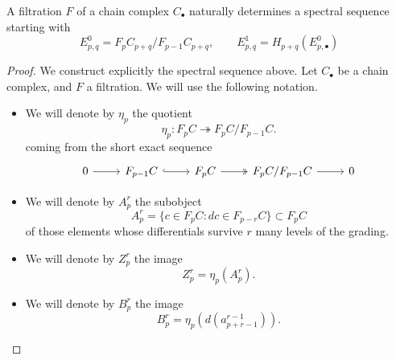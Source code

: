 \documentclass[main.tex]{subfiles}
\begin{document}
\begin{theorem}
  \label{thm:filtered_spectral_sequence_construction_thereom}
  A filtration $F$ of a chain complex $C_{\bullet}$ naturally determines a spectral sequence starting with
  \begin{equation*}
    E^{0}_{p,q} = F_{p}C_{p+q}/F_{p-1}C_{p+q},\qquad E^{1}_{p,q} = H_{p+q}(E^{0}_{p,
    \bullet})
  \end{equation*}
\end{theorem}
\begin{proof}
  We construct explicitly the spectral sequence above. Let $C_{\bullet}$ be a chain complex, and $F$ a filtration. We will use the following notation.
  \begin{itemize}
    \item We will denote by $\eta_{p}$ the quotient
      \begin{equation*}
        \eta_{p}\colon F_{p}C \twoheadrightarrow F_{p}C/F_{p-1}C.
      \end{equation*}
      coming from the short exact sequence
      \begin{equation*}
        \begin{tikzcd}
          0
          \arrow[r]
          & F_{p-1}C
          \arrow[r, hook]
          & F_{p}C
          \arrow[r, two heads]
          & F_{p}C/F_{p-1}C
          \arrow[r]
          & 0
        \end{tikzcd}
      \end{equation*}

    \item We will denote by $A^{r}_{p}$ the subobject
      \begin{equation*}
        A^{r}_{p} = \{c \in F_{p}C\colon dc \in F_{p-r}C\} \subset F_{p}C
      \end{equation*}
      of those elements whose differentials survive $r$ many levels of the grading.

    \item We will denote by $Z^{r}_{p}$ the image
      \begin{equation*}
        Z^{r}_{p} = \eta_{p}(A^{r}_{p}).
      \end{equation*}

    \item We will denote by $B^{r}_{p}$ the image
      \begin{equation*}
        B^{r}_{p} = \eta_{p}(d(a^{r-1}_{p+r-1})).
      \end{equation*}
  \end{itemize}


\end{proof}
\end{document}

